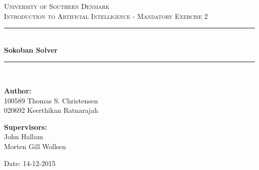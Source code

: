 \begin{titlepage}
\begin{center}

\textsc{\LARGE University of Southern Denmark}\\[1.5cm]
\textsc{\large Introduction to Artificial Intelligence - Mandatory Exercise 2}\\[0.5cm]
\vfill
\hrule ~\\[0.3cm]
{ \huge \bfseries Sokoban Solver\\[0.4cm] }
\hrule ~\\[1.5cm]
\vfill

\begin{minipage}[t]{.49\textwidth}
\begin{flushleft} \large
\textbf{Author:}\\
100589 Thomas S. Christensen \\
020692 Keerthikan Ratnarajah\\
\end{flushleft}
\end{minipage}
\begin{minipage}[t]{.49\textwidth}
\begin{flushright} \large
\textbf{Supervisors:} \\
John Hallam\\
Morten Gill Wollsen
\end{flushright}
\end{minipage}

\vspace{1.2cm}
Date: 14-12-2015

\end{center}
\end{titlepage}